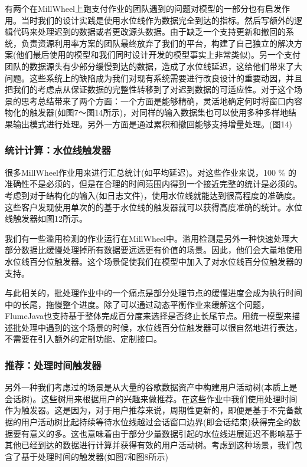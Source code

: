 \documentclass[oneside]{ctexbook}
\begin{document}
有两个在MillWheel上跑支付作业的团队遇到的问题对模型的一部分也有启发作用。当时我们的设计实践是使用水位线作为数据完全到达的指标。然后写额外的逻辑代码来处理迟到的数据或者更改源头数据。由于缺乏一个支持更新和撤回的系统，负责资源利用率方案的团队最终放弃了我们的平台，构建了自己独立的解决方案(他们最后使用的模型和我们同时设计开发的模型事实上非常类似)。另一个支付团队的数据源头有少部分缓慢到达的数据，造成了水位线延迟，这给他们带来了大问题。这些系统上的缺陷成为我们对现有系统需要进行改良设计的重要动因，并且把我们的考虑点从保证数据的完整性转移到了对迟到数据的可适应性。对于这个场景的思考总结带来了两个方面：一个方面是能够精确，灵活地确定何时将窗口内容物化的触发器(如图7～图14所示)，对同样的输入数据集也可以使用多种多样地结果输出模式进行处理。另外一方面是通过累积和撤回能够支持增量处理。(图14)

\subsubsection{统计计算：水位线触发器}

很多MillWheel作业用来进行汇总统计(如平均延迟)。对这些作业来说，100 \% 的准确性不是必须的，但是在合理的时间范围内得到一个接近完整的统计是必须的。考虑到对于结构化的输入(如日志文件)，使用水位线就能达到很高程度的准确度。这些客户发现使用单次的的基于水位线的触发器就可以获得高度准确的统计。水位线触发器如图12所示。

我们有一些滥用检测的作业运行在MillWheel中。滥用检测是另外一种快速处理大部分数据比缓慢处理掉所有数据要远远更有价值的场景。因此，他们会大量地使用水位线百分位触发器。这个场景促使我们在模型中加入了对水位线百分位触发器的支持。

与此相关的，批处理作业中的一个痛点是部分处理节点的缓慢进度会成为执行时间中的长尾，拖慢整个进度。除了可以通过动态平衡作业来缓解这个问题，FlumeJava也支持基于整体完成百分度来选择是否终止长尾节点。用统一模型来描述批处理中遇到的这个场景的时候，水位线百分位触发器可以很自然地进行表达，不需要在引入额外的定制功能、定制接口。

\subsubsection{推荐：处理时间触发器}

另外一种我们考虑过的场景是从大量的谷歌数据资产中构建用户活动树(本质上是会话树)。这些树用来根据用户的兴趣来做推荐。在这些作业中我们使用处理时间作为触发器。这是因为，对于用户推荐来说，周期性更新的，即便是基于不完备数据的用户活动树比起持续等待水位线越过会话窗口边界(即会话结束)获得完全的数据要有意义的多。这也意味着由于部分少量数据引起的水位线进展延迟不影响基于其他已经到达的数据进行计算并获得有效的用户活动树。考虑到这种场景，我们包含了基于处理时间的触发器(如图7和图8所示)
\end{document}
